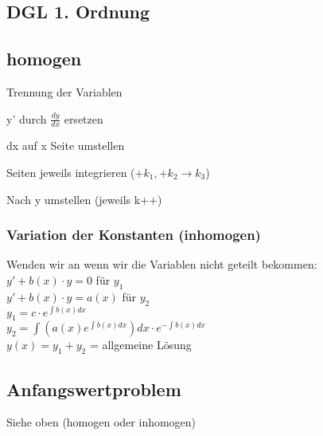 \documentclass[a4paper, 10pt, landscape]{article}
\begin{document}
\begin{multicols}{5}
\begin{small}
		\subsection{DGL 1. Ordnung}
			\subsection{homogen}
				\begin{compactenum}
					\item Trennung der Variablen
					\item y' durch $\frac{dy}{dx}$ ersetzen
					\item dx auf x Seite umstellen
					\item Seiten jeweils integrieren ($+k_1, +k_2\rightarrow k_3$)
					\item Nach y umstellen (jeweils k++)
				\end{compactenum}	
			\subsubsection{Variation der Konstanten (inhomogen)}
				Wenden wir an wenn wir die Variablen nicht geteilt bekommen:\\
				$y'+b(x)\cdot y=0$ für $y_1$\\
				$y'+b(x)\cdot y=a(x)$ für $y_2$\\
				
				$y_1 = c\cdot e^{\int b(x)dx}$\\
				$y_2 = \int(a(x)e^{\int b(x)dx})dx\cdot e^{-\int b(x)dx}$\\
				
				$y(x)=y_1+y_2$ = allgemeine Lösung
			\subsection{Anfangswertproblem}
				Siehe oben (homogen oder inhomogen)

\end{small}
\end{multicols}
\end{document}

